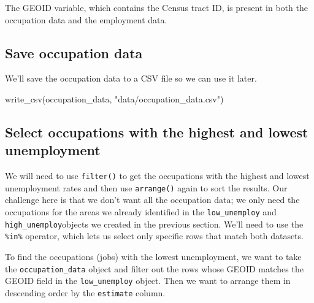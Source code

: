 \documentclass[
  krantz2]{krantz}
\makeatletter
\newenvironment{Shaded}{\begin{snugshade}}{\end{snugshade}}
\newcommand{\FunctionTok}[1]{\textcolor[rgb]{0,0,0}{#1}}
\newcommand{\NormalTok}[1]{#1}
\newcommand{\OtherTok}[1]{\textcolor[rgb]{0.37,0.37,0.37}{#1}}
\newcommand{\SpecialCharTok}[1]{\textcolor[rgb]{0,0,0}{#1}}
\newcommand{\StringTok}[1]{\textcolor[rgb]{0.5,0.5,0.5}{#1}}
\newenvironment{kframe}{%
\medskip{}
\setlength{\fboxsep}{.8em}
 \def\at@end@of@kframe{}%
 \ifinner\ifhmode%
  \def\at@end@of@kframe{\end{minipage}}%
  \begin{minipage}{\columnwidth}%
 \fi\fi%
 \def\FrameCommand##1{\hskip\@totalleftmargin \hskip-\fboxsep
 \colorbox{shadecolor}{##1}\hskip-\fboxsep
     \hskip-\linewidth \hskip-\@totalleftmargin \hskip\columnwidth}%
 \MakeFramed {\advance\hsize-\width
   \@totalleftmargin\z@ \linewidth\hsize
   \@setminipage}}%
 {\par\unskip\endMakeFramed%
 \at@end@of@kframe}
\renewenvironment{Shaded}{\begin{kframe}}{\end{kframe}}
\makeatother
\begin{document}
The GEOID variable, which contains the Census tract ID, is present in both the occupation data and the employment data.

\hypertarget{save-occupation-data}{%
\subsection{Save occupation data}\label{save-occupation-data}}

We'll save the occupation data to a CSV file so we can use it later.

\begin{Shaded}
\begin{Highlighting}[]
\FunctionTok{write\_csv}\NormalTok{(occupation\_data, }\StringTok{"data/occupation\_data.csv"}\NormalTok{) }
\end{Highlighting}
\end{Shaded}

\hypertarget{select-occupations-with-the-highest-and-lowest-unemployment}{%
\subsection{Select occupations with the highest and lowest unemployment}\label{select-occupations-with-the-highest-and-lowest-unemployment}}

We will need to use \texttt{filter()} to get the occupations with the highest and lowest unemployment rates and then use \texttt{arrange()} again to sort the results. Our challenge here is that we don't want all the occupation data; we only need the occupations for the areas we already identified in the \texttt{low\_unemploy} and \texttt{high\_unemploy}objects we created in the previous section. We'll need to use the \texttt{\%in\%} operator, which lets us select only specific rows that match both datasets.

To find the occupations (jobs) with the lowest unemployment, we want to take the \texttt{occupation\_data} object and filter out the rows whose GEOID matches the GEOID field in the \texttt{low\_unemploy} object. Then we want to arrange them in descending order by the \texttt{estimate} column.

\begin{Shaded}
\end{Shaded}
\end{document}
